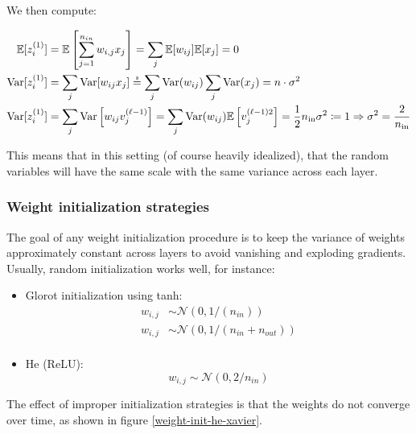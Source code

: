 \documentclass[a4paper,10pt,twoside]{article}
\newcommand\myeq{\mathrel{\overset{\makebox[0pt]{\mbox{\normalfont\tiny\sffamily a}}}{=}}}
\begin{document}
We then compute:

\begin{align*}
    \mathbb{E}[z_i^{(1)}]&=\mathbb{E}\left[\sum_{j=1}^{n_{in}} w_{i,j}x_j\right]=\sum_{j}\mathbb{E}[w_{ij}]\mathbb{E}[x_j]=0\\
    \text{Var}[z_i^{(1)}]&=\sum_{j}\text{Var}[w_{ij}x_j]\myeq\sum_{j}\text{Var}(w_{ij})\sum_{j}\text{Var}(x_{j})=n\cdot \sigma^{2}\\
    \text{Var}[z_i^{(1)}]&=\sum_{j}\text{Var}\left[w_{ij}v_j^{(\ell - 1)}\right] = \sum_{j}\text{Var}(w_{ij})\mathbb{E}\left[v_j^{(\ell -1)2}\right]=\frac{1}{2}n_{\text{in}}\sigma^2\coloneqq 1\Rightarrow\sigma^2=\frac{2}{n_{\text{in}}}
\end{align*}

This means that in this setting (of course heavily idealized), that the random variables will have the same scale with the same variance across each layer.

\subsubsection{Weight initialization strategies}

The goal of any weight initialization procedure is to keep the variance of weights approximately constant across layers to avoid vanishing and exploding gradients. Usually, random initialization works well, for instance:
\begin{itemize}
    \item Glorot initialization using tanh:
    \begin{align*}
        w_{i,j} &\sim\mathcal{N} (0,1/(n_{in}))\\
        w_{i,j} &\sim\mathcal{N} (0,1/(n_{in}+n_{out}))\\
    \end{align*}
    \item He (ReLU):
    \begin{equation*}
        w_{i,j}\sim\mathcal{N}(0,2/n_{in})
    \end{equation*}
\end{itemize}

The effect of improper initialization strategies is that the weights do not converge over time, as shown in figure \ref{weight-init-he-xavier}.
\end{document}
